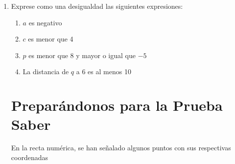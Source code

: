 \documentclass[letterpaper,fleqn]{article}
\begin{document}
\begin{enumerate}
\begin{enumerate}
  \end{enumerate}
  \item Exprese como una desigualdad las siguientes expresiones:
  \begin{enumerate}
    \item $ a $ es negativo \hspace*{1cm} \underline{\hspace*{4cm}}
    \item $ c $ es menor que 4 \hspace*{1cm} \underline{\hspace*{4cm}}
    \item $ p $ es menor que 8 y mayor o igual que $ -5 $ \hspace*{1cm} \underline{\hspace*{4cm}}
    \item La distancia de $ q $ a 6 es al menos 10 \hspace*{1cm} \underline{\hspace*{4cm}}
  \end{enumerate}
  \section*{Preparándonos para la Prueba Saber}
  En la recta numérica, se han señalado algunos puntos con sus respectivas coordenadas
  

\end{enumerate}
\end{document}
